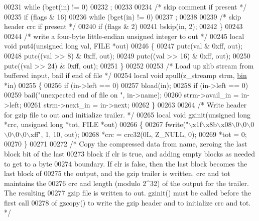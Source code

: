 \begin{DoxyCode}
{00231         \textcolor{keywordflow}{while} (bget(in) != 0)
00232             ;
00233 
00234     \textcolor{comment}{/* skip comment if present */}
00235     \textcolor{keywordflow}{if} (flags & 16)
00236         \textcolor{keywordflow}{while} (bget(in) != 0)
00237             ;
00238 
00239     \textcolor{comment}{/* skip header crc if present */}
00240     \textcolor{keywordflow}{if} (flags & 2)
00241         bskip(in, 2);
00242 \}
00243 
00244 \textcolor{comment}{/* write a four-byte little-endian unsigned integer to out */}
00245 local \textcolor{keywordtype}{void} put4(\textcolor{keywordtype}{unsigned} \textcolor{keywordtype}{long} val, FILE *out)
00246 \{
00247     putc(val & 0xff, out);
00248     putc((val >> 8) & 0xff, out);
00249     putc((val >> 16) & 0xff, out);
00250     putc((val >> 24) & 0xff, out);
00251 \}
00252 
00253 \textcolor{comment}{/* Load up zlib stream from buffered input, bail if end of file */}
00254 local \textcolor{keywordtype}{void} zpull(z\_streamp strm, \hyperlink{structbin}{bin} *in)
00255 \{
00256     \textcolor{keywordflow}{if} (in->left == 0)
00257         bload(in);
00258     \textcolor{keywordflow}{if} (in->left == 0)
00259         bail(\textcolor{stringliteral}{"unexpected end of file on "}, in->name);
00260     strm->avail\_in = in->left;
00261     strm->next\_in = in->next;
00262 \}
00263 
00264 \textcolor{comment}{/* Write header for gzip file to out and initialize trailer. */}
00265 local \textcolor{keywordtype}{void} gzinit(\textcolor{keywordtype}{unsigned} \textcolor{keywordtype}{long} *crc, \textcolor{keywordtype}{unsigned} \textcolor{keywordtype}{long} *tot, FILE *out)
00266 \{
00267     fwrite(\textcolor{stringliteral}{"\(\backslash\)x1f\(\backslash\)x8b\(\backslash\)x08\(\backslash\)0\(\backslash\)0\(\backslash\)0\(\backslash\)0\(\backslash\)0\(\backslash\)0\(\backslash\)xff"}, 1, 10, out);
00268     *crc = crc32(0L, Z\_NULL, 0);
00269     *tot = 0;
00270 \}
00271 
00272 \textcolor{comment}{/* Copy the compressed data from name, zeroing the last block bit of the last}
00273 \textcolor{comment}{   block if clr is true, and adding empty blocks as needed to get to a byte}
00274 \textcolor{comment}{   boundary.  If clr is false, then the last block becomes the last block of}
00275 \textcolor{comment}{   the output, and the gzip trailer is written.  crc and tot maintains the}
00276 \textcolor{comment}{   crc and length (modulo 2^32) of the output for the trailer.  The resulting}
00277 \textcolor{comment}{   gzip file is written to out.  gzinit() must be called before the first call}
00278 \textcolor{comment}{   of gzcopy() to write the gzip header and to initialize crc and tot. */}
}
\end{DoxyCode}
